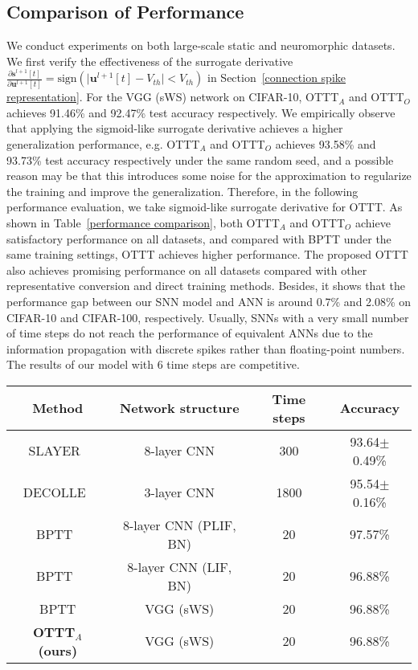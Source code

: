 \documentclass{article}
\begin{document}
\subsection{Comparison of Performance}
\vspace{-2mm}
We conduct experiments on both large-scale static and neuromorphic datasets. We first verify the effectiveness of the surrogate derivative $\frac{\partial \mathbf{s}^{l+1}[t]}{\partial \mathbf{u}^{l+1}[t]}=\text{sign}\left(\lvert \mathbf{u}^{l+1}[t] - V_{th} \rvert < V_{th}\right)$ in Section~\ref{connection spike representation}. For the VGG (sWS) network on CIFAR-10, OTTT$_A$ and OTTT$_O$ achieves 91.46\% and 92.47\% test accuracy respectively. We empirically observe that applying the sigmoid-like surrogate derivative achieves a higher generalization performance, e.g. OTTT$_A$ and OTTT$_O$ achieves 93.58\% and 93.73\% test accuracy respectively under the same random seed, and a possible reason may be that this introduces some noise for the approximation to regularize the training and improve the generalization. Therefore, in the following performance evaluation, we take sigmoid-like surrogate derivative for OTTT. As shown in Table~\ref{performance comparison}, both OTTT$_A$ and OTTT$_O$ achieve satisfactory performance on all datasets, and compared with BPTT under the same training settings, OTTT achieves higher performance. The proposed OTTT also achieves promising performance on all datasets compared with other representative conversion and direct training methods. Besides, it shows that the performance gap between our SNN model and ANN is around 0.7\% and 2.08\% on CIFAR-10 and CIFAR-100, respectively. Usually, SNNs with a very small number of time steps do not reach the performance of equivalent ANNs due to the information propagation with discrete spikes rather than floating-point numbers. The results of our model with 6 time steps are competitive.

\begin{table}
	\centering
	\small
	\tabcolsep=2mm
	\begin{tabular}{cccc}
		\toprule[1pt]
		Method & Network structure & Time steps & Accuracy\\
		\midrule[0.5pt]
		SLAYER~\cite{shrestha2018slayer} & 8-layer CNN & 300 & 93.64$\pm$0.49\%\\
		DECOLLE~\cite{kaiser2020synaptic} & 3-layer CNN & 1800 & 95.54$\pm$0.16\% \\
		BPTT~\cite{Fang_2021_ICCV} & 8-layer CNN (PLIF, BN) & 20 & 97.57\% \\
		BPTT~\cite{Fang_2021_ICCV} & 8-layer CNN (LIF, BN) & 20 & 96.88\% \\
		\hline
		BPTT & VGG (sWS) & 20 & 96.88\% \\
		\hline
		\textbf{OTTT$_A$ (ours)} & VGG (sWS) & 20 & 96.88\%\\
		\bottomrule[1pt]
	\end{tabular}
	\label{dvs128 gesture}
    \vspace{-3mm}
\end{table}
\end{document}
